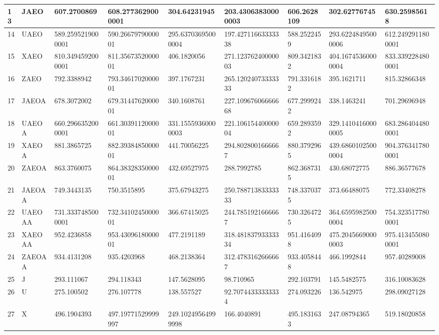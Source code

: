 {\begin{longtable}{|l|l|l|l|l|l|l|l|l|}
        13 & JAEO & 607.2700869 & 608.2773629000001 & 304.64231945 & 203.43063830000003 & 606.2628109 & 302.62776745 & 630.25985618 \\ \hline
        14 & UAEO & 589.2595219000001 & 590.2667979000001 & 295.63703695000004 & 197.42711663333338 & 588.2522459 & 293.62248495000006 & 612.2492911800001 \\ \hline
        15 & XAEO & 810.3494592000001 & 811.3567352000001 & 406.1820056 & 271.12376240000003 & 809.3421832 & 404.16745360000004 & 833.3392284800001 \\ \hline
        16 & ZAEO & 792.3388942 & 793.3461702000001 & 397.1767231 & 265.12024073333333 & 791.3316182 & 395.1621711 & 815.32866348 \\ \hline
        17 & JAEOA & 678.3072002 & 679.3144762000001 & 340.1608761 & 227.10967606666668 & 677.2999242 & 338.1463241 & 701.29696948 \\ \hline
        18 & UAEOA & 660.2966352000001 & 661.3039112000001 & 331.15559360000003 & 221.10615440000004 & 659.2893592 & 329.14104160000005 & 683.2864044800001 \\ \hline
        19 & XAEOA & 881.3865725 & 882.3938485000001 & 441.70056225 & 294.8028001666667 & 880.3792965 & 439.68601025000004 & 904.3763417800001 \\ \hline
        20 & ZAEOA & 863.3760075 & 864.3832835000001 & 432.69527975 & 288.7992785 & 862.3687315 & 430.68072775 & 886.36577678 \\ \hline
        21 & JAEOAA & 749.3443135 & 750.3515895 & 375.67943275 & 250.78871383333333 & 748.3370375 & 373.66488075 & 772.33408278 \\ \hline
        22 & UAEOAA & 731.3337485000001 & 732.3410245000001 & 366.67415025 & 244.7851921666667 & 730.3264725 & 364.65959825000004 & 754.3235177800001 \\ \hline
        23 & XAEOAA & 952.4236858 & 953.4309618000001 & 477.2191189 & 318.48183793333334 & 951.4164098 & 475.20456690000003 & 975.4134550800001 \\ \hline
        24 & ZAEOAA & 934.4131208 & 935.4203968 & 468.2138364 & 312.4783162666667 & 933.4058448 & 466.1992844 & 957.40289008 \\ \hline
        25 & J & 293.111067 & 294.118343 & 147.5628095 & 98.710965 & 292.103791 & 145.5482575 & 316.10083628 \\ \hline
        26 & U & 275.100502 & 276.107778 & 138.557527 & 92.70744333333334 & 274.093226 & 136.542975 & 298.09027128 \\ \hline
        27 & X & 496.1904393 & 497.19771529999997 & 249.10249564999998 & 166.4040891 & 495.1831633 & 247.08794365 & 519.18020858 \\ \hline

\end{longtable}}
